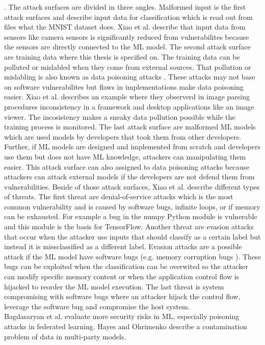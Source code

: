 \cite{lecun_cortes_burges_2017}. The attack surfaces are divided in three angles. Malformed input is the first attack surfaces and describe input data for classification which is read out from files what the MNIST dataset does. Xiao et al. describe that input data from sensors like camera sensors is significantly reduced from vulnerabilites because the sensors are directly connected to the ML model. The second attack surface are training data where this thesis is specified on. The training data can be polluted or mislabled when they come from external sources. That pollution or mislabling is also known as data poisoning attacks \cite{DBLP:conf/icml/BiggioNL12}. These attacks may not base on software vulnerabilites but flaws in implementations make data poisoning easier. Xiao et al. describes an example where they observerd in image parsing procedures inconsistency in a framework and desktop applications like an image viewer. The incosistency makes a sneaky data pollution possible while the training process is monitored. The last attack surface are malformed ML models which are used models by developers that took them from other developers. Further, if ML models are designed and implemented from scratch and developers use them but does not have ML knowledge, attackers can manipulating them easier. This attack surface can also assigned to data poisoning attacks because attackers can attack external models if the developers are not defend them from vulnerabilities. Beside of those attack surfaces, Xiao et al. describe different types of threats. The first threat are denial-of-service attacks which is the most common vulnerability and is caused by software bugs, infinite loops, or if memory can be exhausted. For example a bug in the numpy Python module is vulnerable and this module is the basis for TensorFlow. Another threat are evasion attacks that occur when the attacker use inputs that should classify as a certain label but instead it is missclassified as a different label. Evasion attacks are a possible attack if the ML model have software bugs (e.g. memory corruption bugs \cite{DBLP:conf/mipro/Novkovic21}). These bugs can be exploited when the classification can be overwited so the attacker can modify specific memory content or when the application control flow is hijacked to reorder the ML model execution. The last threat is system compromising with software bugs where an attacker hijack the control flow, leverage the software bug and compromise the host system. \\ Bagdasaryan et al. \cite{Bagdasaryan2020HowTB} evaluate more security risks in ML, especially poisoning attacks in federated learning. Hayes and Ohrimenko \cite{Hayes2018ContaminationAA} describe a contamination problem of data in multi-party models.

